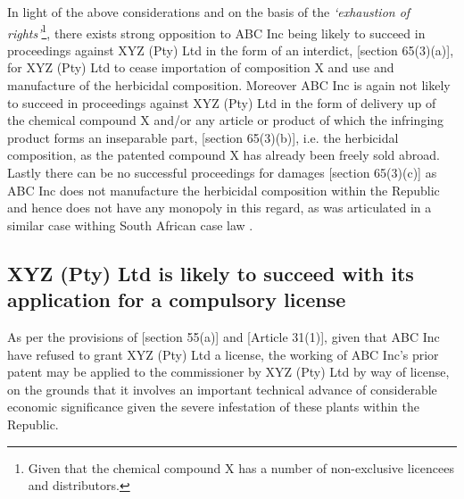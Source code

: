 \documentclass[11pt]{article}
\begin{document}
In light of the above considerations and on the basis of the \emph{`exhaustion of rights'}\footnote{Given that the chemical compound X has a
number of non-exclusive licencees and distributors.}, there exists strong opposition to ABC Inc being likely to succeed in proceedings against XYZ (Pty) Ltd in the
form of an interdict, [section 65(3)(a)]\cite{rsa78_patents_act}, for XYZ (Pty) Ltd to cease importation of composition X and use and
manufacture of the herbicidal composition. Moreover ABC Inc is again not likely to succeed in proceedings against XYZ (Pty) Ltd in
the form of delivery up of the chemical compound X and/or any article or product of which the infringing product forms an inseparable
part, [section 65(3)(b)]\cite{rsa78_patents_act}, i.e. the herbicidal composition, as the patented compound X has already been
freely sold abroad. Lastly there can be no successful proceedings for damages [section 65(3)(c)]\cite{rsa78_patents_act} as ABC Inc
does not manufacture the herbicidal composition within the Republic and hence does not have any monopoly in this regard, as was
articulated in a similar case withing South African case law  \cite{corbett87_stauffer_chem_v_safsan} .

\subsection{XYZ (Pty) Ltd is likely to succeed with its application for a compulsory license}
\label{sec:orga67db75}
As per the provisions of [section 55(a)]\cite{rsa78_patents_act} and [Article 31(1)]\cite{wto17_trips}, given that ABC Inc have
refused to grant XYZ (Pty) Ltd a license, the working of ABC Inc's prior patent may be applied to the commissioner by XYZ (Pty)
Ltd by way of license, on the grounds that it involves an important technical advance of considerable economic significance given
the severe infestation of these plants within the Republic.\\
\end{document}
